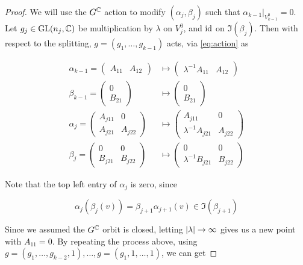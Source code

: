 \documentclass{article}
\begin{document}
\begin{proof}
    We will use the \(G^{\mathbb{C}}\) action to modify \((\alpha_j, \beta_j)\) such that \(\alpha_{k-1}\vert_{V_{k-1}^0} = 0\). Let \(g_j \in \operatorname{GL}(n_j, \mathbb{C})\) be multiplication by \(\lambda\) on \(V_j^0\), and \(\operatorname{id}\) on \(\Im(\beta_j)\). Then with respect to the splitting, \(g = (g_1, \dots, g_{k-1})\) acts, via \cref{eq:action} as

    \begin{align*}
        \alpha_{k-1} = \begin{pmatrix}
            A_{11} & A_{12}
        \end{pmatrix} &\mapsto \begin{pmatrix}
            \lambda^{-1}A_{11} & A_{12}
        \end{pmatrix} \\
        \beta_{k-1} = \begin{pmatrix}
            0 \\ B_{21}
        \end{pmatrix} &\mapsto \begin{pmatrix}
            0 \\ B_{21}
        \end{pmatrix} \\
        \alpha_j = \begin{pmatrix}
            A_{j11} & 0 \\
            A_{j21} & A_{j22}
        \end{pmatrix} &\mapsto \begin{pmatrix}
            A_{j11} & 0 \\
            \lambda^{-1}A_{j21} & A_{j22}
        \end{pmatrix} \\
        \beta_j = \begin{pmatrix}
            0 & 0 \\
            B_{j21} & B_{j22}
        \end{pmatrix} &\mapsto \begin{pmatrix}
            0 & 0 \\
            \lambda^{-1}B_{j21} & B_{j22}
        \end{pmatrix}
    \end{align*}

    Note that the top left entry of \(\alpha_j\) is zero, since

    \[\alpha_j(\beta_j(v)) = \beta_{j+1}\alpha_{j+1}(v) \in \Im(\beta_{j+1})\]

    Since we assumed the \(G^{\mathbb{C}}\) orbit is closed, letting \(\abs{\lambda} \to \infty\) gives us a new point with \(A_{11} = 0\). By repeating the process above, using \(g = (g_1, \dots, g_{k-2}, 1), \dots, g = (g_1, 1, \dots, 1)\), we can get


\end{proof}
\end{document}
